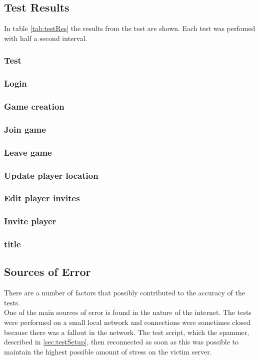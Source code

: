 \subsection{Test Results}
In table \cref{tab:testRes} the results from the test are shown. Each test was perfomed with half a second interval.

\subsubsection{Test}
\subsubsection{Login}
\subsubsection{Game creation}
\subsubsection{Join game}
\subsubsection{Leave game}
\subsubsection{Update player location}
\subsubsection{Edit player invites}
\subsubsection{Invite player}
\subsubsection{title}

\subsection{Sources of Error}
There are a number of factors that possibly contributed to the accuracy of the tests.\\

One of the main sources of error is found in the nature of the internet. The tests were performed on a small local network and connections were sometimes closed because there was a fallout in the network. The test script, which the spammer, described in \cref{sec:testSetup}, then reconnected as soon as this was possible to maintain the highest possible amount of stress on the victim server. 
